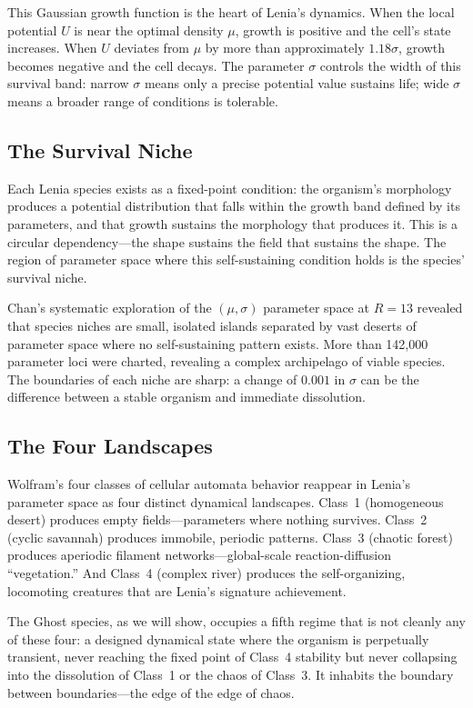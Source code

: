 \documentclass[11pt,a4paper]{article}
\begin{document}
This Gaussian growth function is the heart of Lenia's dynamics. When the
local potential $U$ is near the optimal density $\mu$, growth is positive
and the cell's state increases. When $U$ deviates from $\mu$ by more than
approximately $1.18\sigma$, growth becomes negative and the cell decays.
The parameter $\sigma$ controls the width of this survival band: narrow
$\sigma$ means only a precise potential value sustains life; wide $\sigma$
means a broader range of conditions is tolerable.

\subsection{The Survival Niche}

Each Lenia species exists as a fixed-point condition: the organism's
morphology produces a potential distribution that falls within the growth
band defined by its parameters, and that growth sustains the morphology that
produces it. This is a circular dependency---the shape sustains the field
that sustains the shape. The region of parameter space where this
self-sustaining condition holds is the species' survival niche.

Chan's systematic exploration of the $(\mu,\sigma)$ parameter space at
$R{=}13$ revealed that species niches are small, isolated islands separated
by vast deserts of parameter space where no self-sustaining pattern exists.
More than 142{,}000 parameter loci were charted, revealing a complex
archipelago of viable species. The boundaries of each niche are sharp: a
change of $0.001$ in $\sigma$ can be the difference between a stable
organism and immediate dissolution.

\subsection{The Four Landscapes}

Wolfram's four classes of cellular automata behavior reappear in Lenia's
parameter space as four distinct dynamical landscapes. Class~1 (homogeneous
desert) produces empty fields---parameters where nothing survives. Class~2
(cyclic savannah) produces immobile, periodic patterns. Class~3 (chaotic
forest) produces aperiodic filament networks---global-scale
reaction-diffusion ``vegetation.'' And Class~4 (complex river) produces the
self-organizing, locomoting creatures that are Lenia's signature
achievement.

The Ghost species, as we will show, occupies a fifth regime that is not
cleanly any of these four: a designed dynamical state where the organism is
perpetually transient, never reaching the fixed point of Class~4 stability
but never collapsing into the dissolution of Class~1 or the chaos of
Class~3. It inhabits the boundary between boundaries---the edge of the edge
of chaos.
\end{document}
